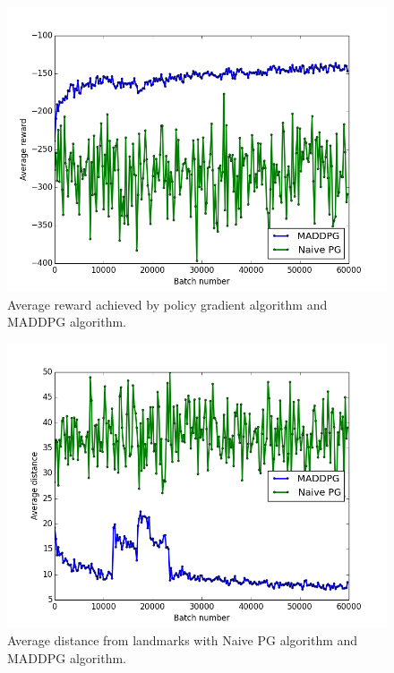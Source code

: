 \documentclass{article}
\begin{document}
\begin{figure}
\begin{center}
\includegraphics[scale=0.4]{MADDPGvsPG}
\end{center}
\caption{Average reward achieved by policy gradient algorithm and MADDPG algorithm.}
\label{fig:MADDPGvsPG}
\end{figure}

\begin{figure}
\begin{center}
\includegraphics[scale=0.4]{MADDPGvsPG_distance}
\end{center}
\caption{Average distance from landmarks with Naive PG algorithm and MADDPG algorithm.}
\label{fig:MADDPGvsPG_distance}
\end{figure}
\end{document}
